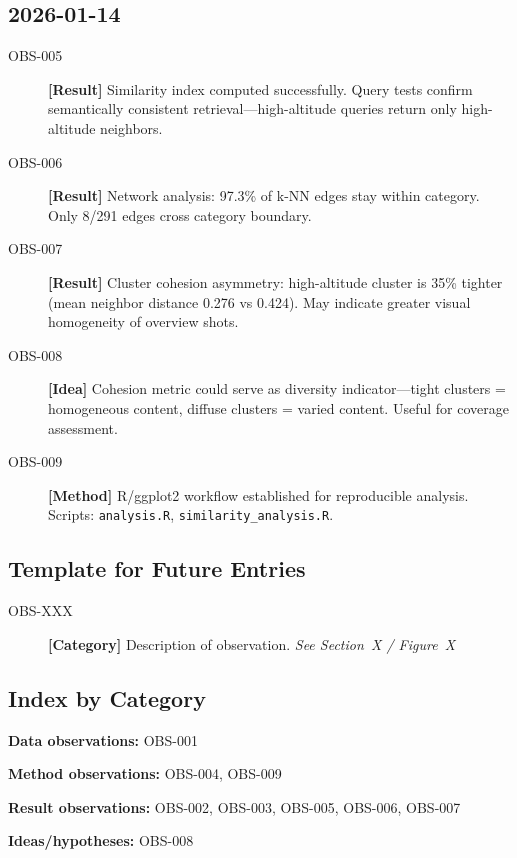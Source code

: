 \subsection*{2026-01-14}

\begin{description}
    \item[OBS-005] \textbf{[Result]} Similarity index computed successfully. Query tests confirm semantically consistent retrieval---high-altitude queries return only high-altitude neighbors.

    \item[OBS-006] \textbf{[Result]} Network analysis: 97.3\% of k-NN edges stay within category. Only 8/291 edges cross category boundary.

    \item[OBS-007] \textbf{[Result]} Cluster cohesion asymmetry: high-altitude cluster is 35\% tighter (mean neighbor distance 0.276 vs 0.424). May indicate greater visual homogeneity of overview shots.

    \item[OBS-008] \textbf{[Idea]} Cohesion metric could serve as diversity indicator---tight clusters = homogeneous content, diffuse clusters = varied content. Useful for coverage assessment.

    \item[OBS-009] \textbf{[Method]} R/ggplot2 workflow established for reproducible analysis. Scripts: \texttt{analysis.R}, \texttt{similarity\_analysis.R}.
\end{description}

\hrulefill

\subsection*{Template for Future Entries}

\begin{description}
    \item[OBS-XXX] \textbf{[Category]} Description of observation. \textit{See Section~X / Figure~X}
\end{description}


\subsection*{Index by Category}

\textbf{Data observations:} OBS-001

\textbf{Method observations:} OBS-004, OBS-009

\textbf{Result observations:} OBS-002, OBS-003, OBS-005, OBS-006, OBS-007

\textbf{Ideas/hypotheses:} OBS-008
